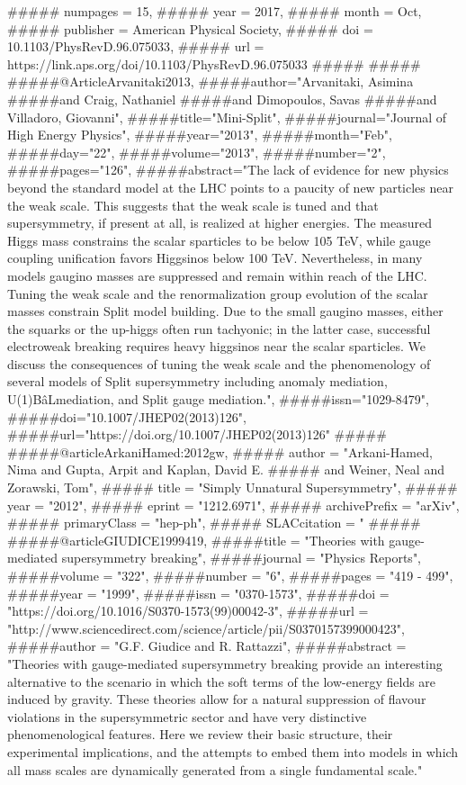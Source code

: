 {{#####  numpages = {15},
#####  year = {2017},
#####  month = {Oct},
#####  publisher = {American Physical Society},
#####  doi = {10.1103/PhysRevD.96.075033},
#####  url = {https://link.aps.org/doi/10.1103/PhysRevD.96.075033}
#####}
#####
#####@Article{Arvanitaki2013,
#####author="Arvanitaki, Asimina
#####and Craig, Nathaniel
#####and Dimopoulos, Savas
#####and Villadoro, Giovanni",
#####title="Mini-Split",
#####journal="Journal of High Energy Physics",
#####year="2013",
#####month="Feb",
#####day="22",
#####volume="2013",
#####number="2",
#####pages="126",
#####abstract="The lack of evidence for new physics beyond the standard model at the LHC points to a paucity of new particles near the weak scale. This suggests that the weak scale is tuned and that supersymmetry, if present at all, is realized at higher energies. The measured Higgs mass constrains the scalar sparticles to be below 105 TeV, while gauge coupling unification favors Higgsinos below 100 TeV. Nevertheless, in many models gaugino masses are suppressed and remain within reach of the LHC. Tuning the weak scale and the renormalization group evolution of the scalar masses constrain Split model building. Due to the small gaugino masses, either the squarks or the up-higgs often run tachyonic; in the latter case, successful electroweak breaking requires heavy higgsinos near the scalar sparticles. We discuss the consequences of tuning the weak scale and the phenomenology of several models of Split supersymmetry including anomaly mediation, U(1)BâLmediation, and Split gauge mediation.",
#####issn="1029-8479",
#####doi="10.1007/JHEP02(2013)126",
#####url="https://doi.org/10.1007/JHEP02(2013)126"
#####}
#####@article{ArkaniHamed:2012gw,
#####      author         = "Arkani-Hamed, Nima and Gupta, Arpit and Kaplan, David E.
#####                        and Weiner, Neal and Zorawski, Tom",
#####      title          = "{Simply Unnatural Supersymmetry}",
#####      year           = "2012",
#####      eprint         = "1212.6971",
#####      archivePrefix  = "arXiv",
#####      primaryClass   = "hep-ph",
#####      SLACcitation   = "%
#####}
#####@article{GIUDICE1999419,
#####title = "Theories with gauge-mediated supersymmetry breaking",
#####journal = "Physics Reports",
#####volume = "322",
#####number = "6",
#####pages = "419 - 499",
#####year = "1999",
#####issn = "0370-1573",
#####doi = "https://doi.org/10.1016/S0370-1573(99)00042-3",
#####url = "http://www.sciencedirect.com/science/article/pii/S0370157399000423",
#####author = "G.F. Giudice and R. Rattazzi",
#####abstract = "Theories with gauge-mediated supersymmetry breaking provide an interesting alternative to the scenario in which the soft terms of the low-energy fields are induced by gravity. These theories allow for a natural suppression of flavour violations in the supersymmetric sector and have very distinctive phenomenological features. Here we review their basic structure, their experimental implications, and the attempts to embed them into models in which all mass scales are dynamically generated from a single fundamental scale."
}}
